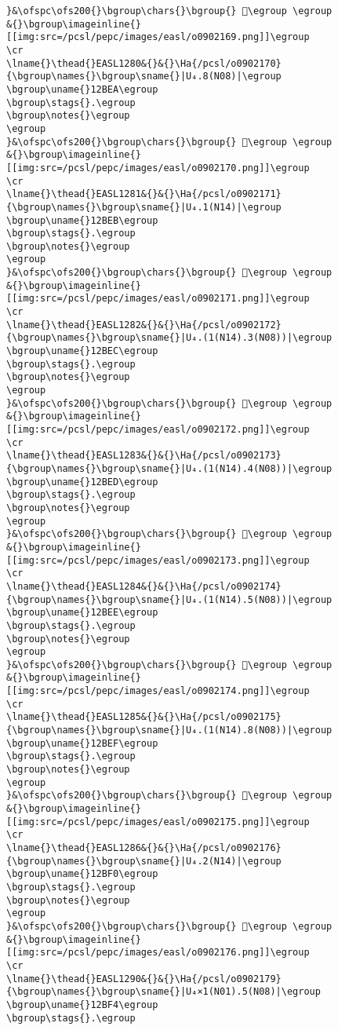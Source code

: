 \begin{verbatim}
}&\ofspc\ofs200{}\bgroup\chars{}\bgroup{} 𒯩\egroup \egroup
&{}\bgroup\imageinline{}[[img:src=/pcsl/pepc/images/easl/o0902169.png]]\egroup
\cr
\lname{}\thead{}EASL1280&{}&{}\Ha{/pcsl/o0902170}{\bgroup\names{}\bgroup\sname{}|U₄.8(N08)|\egroup
\bgroup\uname{}12BEA\egroup
\bgroup\stags{}.\egroup
\bgroup\notes{}\egroup
\egroup
}&\ofspc\ofs200{}\bgroup\chars{}\bgroup{} 𒯪\egroup \egroup
&{}\bgroup\imageinline{}[[img:src=/pcsl/pepc/images/easl/o0902170.png]]\egroup
\cr
\lname{}\thead{}EASL1281&{}&{}\Ha{/pcsl/o0902171}{\bgroup\names{}\bgroup\sname{}|U₄.1(N14)|\egroup
\bgroup\uname{}12BEB\egroup
\bgroup\stags{}.\egroup
\bgroup\notes{}\egroup
\egroup
}&\ofspc\ofs200{}\bgroup\chars{}\bgroup{} 𒯫\egroup \egroup
&{}\bgroup\imageinline{}[[img:src=/pcsl/pepc/images/easl/o0902171.png]]\egroup
\cr
\lname{}\thead{}EASL1282&{}&{}\Ha{/pcsl/o0902172}{\bgroup\names{}\bgroup\sname{}|U₄.(1(N14).3(N08))|\egroup
\bgroup\uname{}12BEC\egroup
\bgroup\stags{}.\egroup
\bgroup\notes{}\egroup
\egroup
}&\ofspc\ofs200{}\bgroup\chars{}\bgroup{} 𒯬\egroup \egroup
&{}\bgroup\imageinline{}[[img:src=/pcsl/pepc/images/easl/o0902172.png]]\egroup
\cr
\lname{}\thead{}EASL1283&{}&{}\Ha{/pcsl/o0902173}{\bgroup\names{}\bgroup\sname{}|U₄.(1(N14).4(N08))|\egroup
\bgroup\uname{}12BED\egroup
\bgroup\stags{}.\egroup
\bgroup\notes{}\egroup
\egroup
}&\ofspc\ofs200{}\bgroup\chars{}\bgroup{} 𒯭\egroup \egroup
&{}\bgroup\imageinline{}[[img:src=/pcsl/pepc/images/easl/o0902173.png]]\egroup
\cr
\lname{}\thead{}EASL1284&{}&{}\Ha{/pcsl/o0902174}{\bgroup\names{}\bgroup\sname{}|U₄.(1(N14).5(N08))|\egroup
\bgroup\uname{}12BEE\egroup
\bgroup\stags{}.\egroup
\bgroup\notes{}\egroup
\egroup
}&\ofspc\ofs200{}\bgroup\chars{}\bgroup{} 𒯮\egroup \egroup
&{}\bgroup\imageinline{}[[img:src=/pcsl/pepc/images/easl/o0902174.png]]\egroup
\cr
\lname{}\thead{}EASL1285&{}&{}\Ha{/pcsl/o0902175}{\bgroup\names{}\bgroup\sname{}|U₄.(1(N14).8(N08))|\egroup
\bgroup\uname{}12BEF\egroup
\bgroup\stags{}.\egroup
\bgroup\notes{}\egroup
\egroup
}&\ofspc\ofs200{}\bgroup\chars{}\bgroup{} 𒯯\egroup \egroup
&{}\bgroup\imageinline{}[[img:src=/pcsl/pepc/images/easl/o0902175.png]]\egroup
\cr
\lname{}\thead{}EASL1286&{}&{}\Ha{/pcsl/o0902176}{\bgroup\names{}\bgroup\sname{}|U₄.2(N14)|\egroup
\bgroup\uname{}12BF0\egroup
\bgroup\stags{}.\egroup
\bgroup\notes{}\egroup
\egroup
}&\ofspc\ofs200{}\bgroup\chars{}\bgroup{} 𒯰\egroup \egroup
&{}\bgroup\imageinline{}[[img:src=/pcsl/pepc/images/easl/o0902176.png]]\egroup
\cr
\lname{}\thead{}EASL1290&{}&{}\Ha{/pcsl/o0902179}{\bgroup\names{}\bgroup\sname{}|U₄×1(N01).5(N08)|\egroup
\bgroup\uname{}12BF4\egroup
\bgroup\stags{}.\egroup

\end{verbatim}
